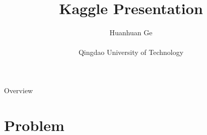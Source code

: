 \documentclass[
 size=12pt,
 paper=smartboard,  %
 mode=present, 		%
 display=slides, 	%
 style=tuliplab,  	%
 pauseslide,
 fleqn,leqno]{powerdot}
\title{Kaggle Presentation}
\author{
Huanhuan Ge
\\
\\Qingdao University of Technology
}
\date{\gitCommitterDate}
\begin{document}
\maketitle



\begin{slide}[toc=,bm=]{Overview}
\begin{spacing}{1.00}
\tableofcontents[content=currentsection,type=1]
\end{spacing}
\end{slide}


\section{Problem}
\end{document}
